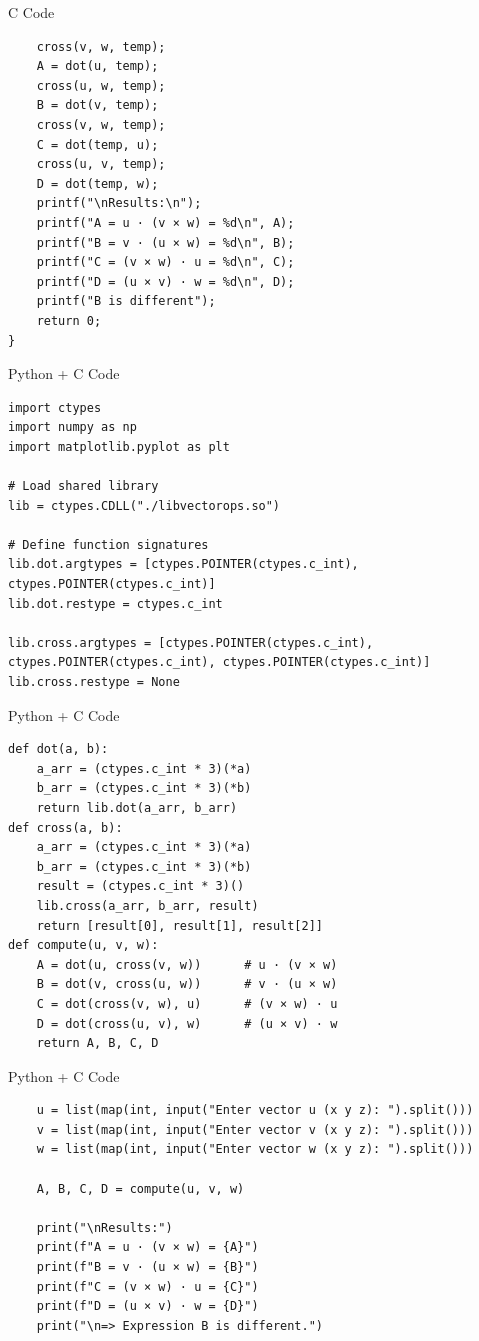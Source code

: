 \documentclass{beamer}
\begin{document}
\begin{frame}[fragile]{C Code}
    \begin{verbatim}
    cross(v, w, temp);
    A = dot(u, temp);
    cross(u, w, temp);
    B = dot(v, temp);
    cross(v, w, temp);
    C = dot(temp, u);
    cross(u, v, temp);
    D = dot(temp, w);
    printf("\nResults:\n");
    printf("A = u · (v × w) = %d\n", A);
    printf("B = v · (u × w) = %d\n", B);
    printf("C = (v × w) · u = %d\n", C);
    printf("D = (u × v) · w = %d\n", D);
    printf("B is different");
    return 0;
}
    \end{verbatim}
\end{frame}

\begin{frame}[fragile]{Python + C Code}
    \begin{verbatim}
import ctypes
import numpy as np
import matplotlib.pyplot as plt

# Load shared library
lib = ctypes.CDLL("./libvectorops.so")

# Define function signatures
lib.dot.argtypes = [ctypes.POINTER(ctypes.c_int), ctypes.POINTER(ctypes.c_int)]
lib.dot.restype = ctypes.c_int

lib.cross.argtypes = [ctypes.POINTER(ctypes.c_int), ctypes.POINTER(ctypes.c_int), ctypes.POINTER(ctypes.c_int)]
lib.cross.restype = None
    \end{verbatim}
\end{frame}

\begin{frame}[fragile]{Python + C Code}
    \begin{verbatim}
def dot(a, b):
    a_arr = (ctypes.c_int * 3)(*a)
    b_arr = (ctypes.c_int * 3)(*b)
    return lib.dot(a_arr, b_arr)
def cross(a, b):
    a_arr = (ctypes.c_int * 3)(*a)
    b_arr = (ctypes.c_int * 3)(*b)
    result = (ctypes.c_int * 3)()
    lib.cross(a_arr, b_arr, result)
    return [result[0], result[1], result[2]]
def compute(u, v, w):
    A = dot(u, cross(v, w))      # u · (v × w)
    B = dot(v, cross(u, w))      # v · (u × w)
    C = dot(cross(v, w), u)      # (v × w) · u
    D = dot(cross(u, v), w)      # (u × v) · w
    return A, B, C, D
    \end{verbatim}
\end{frame}

\begin{frame}[fragile]{Python + C Code}
    \begin{verbatim}
    u = list(map(int, input("Enter vector u (x y z): ").split()))
    v = list(map(int, input("Enter vector v (x y z): ").split()))
    w = list(map(int, input("Enter vector w (x y z): ").split()))

    A, B, C, D = compute(u, v, w)

    print("\nResults:")
    print(f"A = u · (v × w) = {A}")
    print(f"B = v · (u × w) = {B}")
    print(f"C = (v × w) · u = {C}")
    print(f"D = (u × v) · w = {D}")
    print("\n=> Expression B is different.")
    \end{verbatim}
\end{frame}
\end{document}
